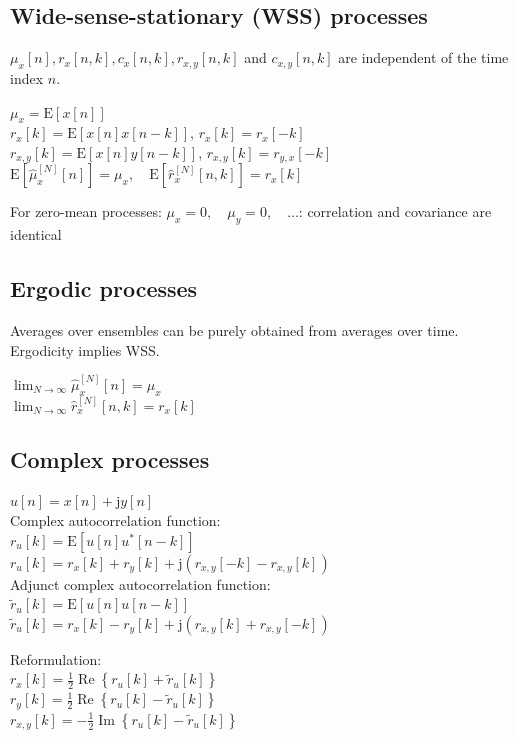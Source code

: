 \documentclass[english]{latex4ei/latex4ei_sheet}
\begin{document}
\begin{sectionbox}
  \subsection{Wide-sense-stationary (WSS) processes}
  $\mu_{x}[n], r_{x}[n, k], c_{x}[n, k], r_{x, y}[n, k]$ and $c_{x, y}[n, k]$ are independent of the time index $n$.
  \begin{emphbox}
    $\mu_{x}=\mathrm{E}[x[n]]$\\
    $r_{x}[k]=\mathrm{E}[x[n] x[n-k]]$, $r_{x}[k]=r_{x}[-k]$\\
    $r_{x, y}[k]=\mathrm{E}[x[n] y[n-k]]$, $r_{x, y}[k]=r_{y, x}[-k]$\\
    $\mathrm{E}\left[\hat{\mu}_{x}^{[N]}[n]\right]=\mu_{x}, \quad \mathrm{E}\left[\hat{r}_{x}^{[N]}[n, k]\right]=r_{x}[k]$
  \end{emphbox}

  For zero-mean processes: $\mu_{x}=0, \quad \mu_{y}=0, \quad \ldots$: correlation and covariance are identical
\end{sectionbox}

\begin{sectionbox}
  \subsection{Ergodic processes}
  Averages over ensembles can be purely obtained from averages over time. Ergodicity implies WSS. 
  \begin{emphbox}
    $\lim _{N \rightarrow \infty} \hat{\mu}_{x}^{[N]}[n]=\mu_{x}$\\
    $\lim _{N \rightarrow \infty} \hat{r}_{x}^{[N]}[n, k]=r_{x}[k]$
  \end{emphbox}
\end{sectionbox}

\begin{sectionbox}
  \subsection{Complex processes}
  $u[n]=x[n]+\mathrm{j} y[n]$\\
  Complex autocorrelation function:\\
  $r_{u}[k]=\mathrm{E}\left[u[n] u^{*}[n-k]\right]$\\
  $r_{u}[k]=r_{x}[k]+r_{y}[k]+\mathrm{j}\left(r_{x, y}[-k]-r_{x, y}[k]\right)$\\
  Adjunct complex autocorrelation function:\\
  $\tilde{r}_{u}[k]=\mathrm{E}[u[n] u[n-k]]$\\
  $\tilde{r}_{u}[k]=r_{x}[k]-r_{y}[k]+\mathrm{j}\left(r_{x, y}[k]+r_{x, y}[-k]\right)$
  
  Reformulation:\\
  $r_{x}[k] =\frac{1}{2} \operatorname{Re}\left\{r_{u}[k]+\tilde{r}_{u}[k]\right\}$ \\
  $r_{y}[k] =\frac{1}{2} \operatorname{Re}\left\{r_{u}[k]-\tilde{r}_{u}[k]\right\}$ \\
  $r_{x, y}[k] =-\frac{1}{2} \operatorname{Im}\left\{r_{u}[k]-\tilde{r}_{u}[k]\right\}$
    

\end{sectionbox}
\end{document}
